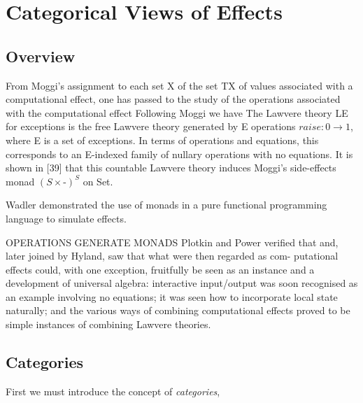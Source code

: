 \section{Categorical Views of Effects}
\subsection{Overview}
From Moggi’s assignment to each set X of the set TX of values associated with a computational effect,
one has passed to the study of the operations associated with the computational effect
\cite{hyland2007category}
Following Moggi we have \cite{plotkin2001adequacy}
The Lawvere theory LE for exceptions is the free Lawvere theory generated by E operations $raise : 0 \rightarrow  1$,
where E is a set of exceptions.
In terms of operations and equations,
this corresponds to an E-indexed family of nullary operations with no equations.
It is shown in [39]
that this countable Lawvere theory induces Moggi’s side-effects monad $(S \times \textrm{-})^S$ on
Set.
\cite{hyland2007category}

Wadler \cite{wadler1990comprehending} demonstrated the use of monads in a pure
functional programming language to simulate effects.

OPERATIONS GENERATE MONADS \cite{plotkin2001adequacy}
Plotkin and Power verified that and, later joined by Hyland, saw that what were then regarded as com- putational effects could, with one exception, fruitfully be seen as an instance and a development of universal algebra: interactive input/output was soon recognised as an example involving no equations; it was seen how to incorporate local state naturally; and the various ways of combining computational effects proved to be simple instances of combining Lawvere theories.


\subsection{Categories}
First we must introduce the concept of \textit{categories},

